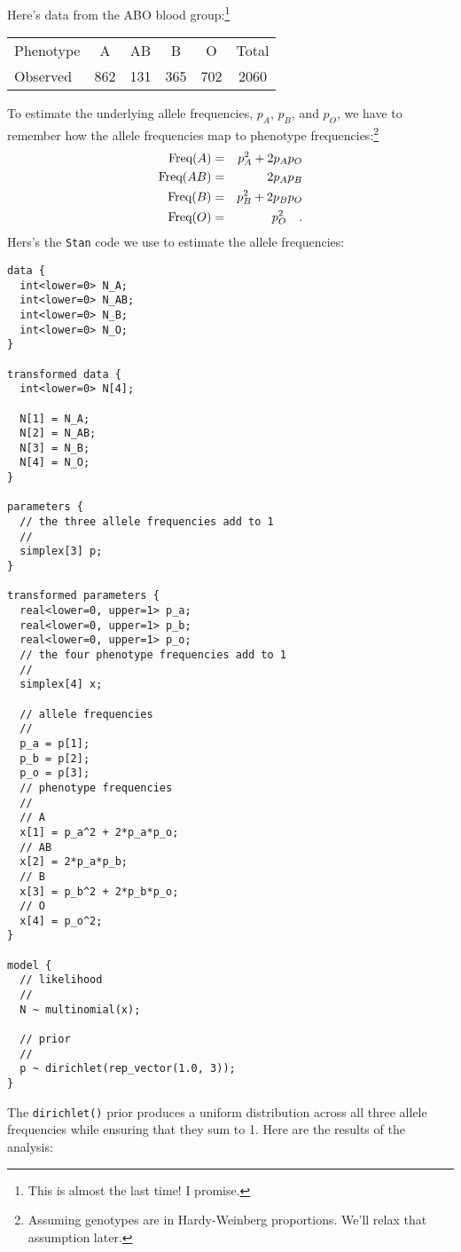 \documentclass[12pt]{article}
\begin{document}
Here's data from the ABO blood group:\footnote{This is almost the last
time! I promise.}
\begin{center}
\begin{tabular}{l|ccccc}
\hline\hline
Phenotype &   A &  AB &   B &   O & Total \\
Observed  & 862 & 131 & 365 & 702 & 2060 \\
\hline
\end{tabular}
\end{center}
To estimate the underlying allele frequencies, $p_A$, $p_B$, and
$p_O$, we have to remember how the allele frequencies map to phenotype
frequencies:\footnote{Assuming genotypes are in Hardy-Weinberg
  proportions. We'll relax that assumption later.}
\begin{eqnarray*}
\hbox{Freq}(A) &=& p_A^2 + 2p_Ap_O \\
\hbox{Freq}(AB) &=& 2p_Ap_B \\
\hbox{Freq}(B) &=& p_B^2 + 2p_Bp_O \\
\hbox{Freq}(O) &=& p_O^2 \quad .
\end{eqnarray*}
Hers's the {\tt Stan} code we use to estimate the allele
frequencies:
\begin{verbatim}
data {
  int<lower=0> N_A;
  int<lower=0> N_AB;
  int<lower=0> N_B;
  int<lower=0> N_O;
}

transformed data {
  int<lower=0> N[4];

  N[1] = N_A;
  N[2] = N_AB;
  N[3] = N_B;
  N[4] = N_O;
}

parameters {
  // the three allele frequencies add to 1
  //
  simplex[3] p;
}

transformed parameters {
  real<lower=0, upper=1> p_a;
  real<lower=0, upper=1> p_b;
  real<lower=0, upper=1> p_o;
  // the four phenotype frequencies add to 1
  //
  simplex[4] x;

  // allele frequencies
  //
  p_a = p[1];
  p_b = p[2];
  p_o = p[3];
  // phenotype frequencies
  //
  // A
  x[1] = p_a^2 + 2*p_a*p_o;
  // AB
  x[2] = 2*p_a*p_b;
  // B
  x[3] = p_b^2 + 2*p_b*p_o;
  // O
  x[4] = p_o^2;
}

model {
  // likelihood
  //
  N ~ multinomial(x);

  // prior
  //
  p ~ dirichlet(rep_vector(1.0, 3));
}
\end{verbatim}
The {\tt dirichlet()} prior produces a uniform distribution across all
three allele frequencies while ensuring that they sum to 1. Here are
the results of the analysis:
\end{document}
